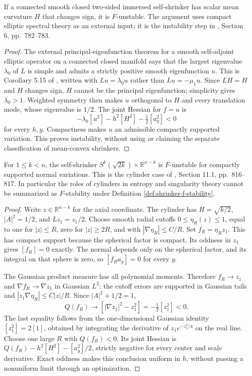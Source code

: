 \begin{theorem}\label{thm:shrinker-changing-sign-instability}
If a connected smooth closed two-sided immersed self-shrinker has scalar mean curvature $H$ that changes sign, it is $F$-unstable. The argument uses compact elliptic spectral theory as an external input; it is the instability step in \cite{CM12}, Section 6, pp.~782--783.
\end{theorem}
\begin{proof}
The external principal-eigenfunction theorem for a smooth self-adjoint elliptic operator on a connected closed manifold says that the largest eigenvalue $\lambda_0$ of $L$ is simple and admits a strictly positive smooth eigenfunction $u$. This is Corollary 5.15 of \cite{CM12}, written with $Lu=\lambda_0u$ rather than $Lu=-\mu_1u$. Since $LH=H$ and $H$ changes sign, $H$ cannot be the principal eigenfunction; simplicity gives $\lambda_0>1$. Weighted symmetry then makes $u$ orthogonal to $H$ and every translation mode, whose eigenvalue is $1/2$. The joint Hessian for $f=u$ is
\[
 -\lambda_0[u^2]-h^2[H^2]-\tfrac12[a_y^2]<0
\]
for every $h,y$. Compactness makes $u$ an admissible compactly supported variation. This proves instability, without using or claiming the separate classification of mean-convex shrinkers.
\end{proof}

\begin{theorem}\label{thm:shrinker-cylinder-f-unstable}
For $1\leq k<n$, the self-shrinker $S^k(\sqrt{2k})\times\mathbb R^{n-k}$ is $F$-unstable for compactly supported normal variations. This is the cylinder case of \cite{CM12}, Section 11.1, pp.~816--817. In particular the roles of cylinders in entropy and singularity theory cannot be summarized as $F$-stability under Definition \ref{def:shrinker-f-stability}.
\end{theorem}
\begin{proof}
Write $z\in\mathbb R^{n-k}$ for the axial coordinate. The cylinder has $H=\sqrt{k/2}$, $|A|^2=1/2$, and $Lz_1=z_1/2$. Choose smooth radial cutoffs $0\leq\eta_R(z)\leq1$, equal to one for $|z|\leq R$, zero for $|z|\geq2R$, and with $|\nabla\eta_R|\leq C/R$. Set $f_R=\eta_Rz_1$. This has compact support because the spherical factor is compact. Its oddness in $z_1$ gives $[f_R]=0$ exactly. The normal depends only on the spherical factor, and its integral on that sphere is zero, so $[f_Ra_y]=0$ for every $y$.

The Gaussian product measure has all polynomial moments. Therefore $f_R\to z_1$ and $\nabla f_R\to\nabla z_1$ in Gaussian $L^2$: the cutoff errors are supported in Gaussian tails and $|z_1\nabla\eta_R|\leq C|z|/R$. Since $|A|^2+1/2=1$,
\[
 Q(f_R)\longrightarrow [|\nabla z_1|^2-z_1^2]
 =-\tfrac12[z_1^2]<0.
\]
The last equality follows from the one-dimensional Gaussian identity $[z_1^2]=2[1]$, obtained by integrating the derivative of $z_1e^{-z_1^2/4}$ on the real line. Choose one large $R$ with $Q(f_R)<0$. Its joint Hessian is $Q(f_R)-h^2[H^2]-[a_y^2]/2$, strictly negative for every center and scale derivative. Exact oddness makes this conclusion uniform in $h$, without passing a nonuniform limit through an optimization.
\end{proof}
